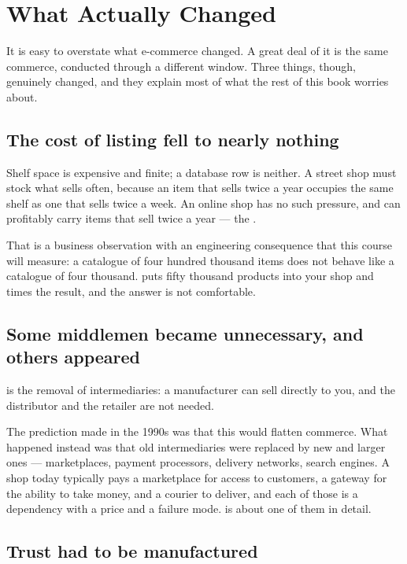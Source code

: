 \section{What Actually Changed}

It is easy to overstate what e-commerce changed. A great deal of it is the same
commerce, conducted through a different window. Three things, though, genuinely
changed, and they explain most of what the rest of this book worries about.

\subsection{The cost of listing fell to nearly nothing}

Shelf space is expensive and finite; a database row is neither. A street shop
must stock what sells often, because an item that sells twice a year occupies
the same shelf as one that sells twice a week. An online shop has no such
pressure, and can profitably carry items that sell twice a year --- the
.

That is a business observation with an engineering consequence that this course
will measure: a catalogue of four hundred thousand items does not behave like a
catalogue of four thousand.  puts fifty thousand products into
your shop and times the result, and the answer is not comfortable.

\subsection{Some middlemen became unnecessary, and others appeared}

 is the removal of intermediaries: a manufacturer can
sell directly to you, and the distributor and the retailer are not needed.

The prediction made in the 1990s was that this would flatten commerce. What
happened instead was that old intermediaries were replaced by new and larger
ones --- marketplaces, payment processors, delivery networks, search engines.
A shop today typically pays a marketplace for access to customers, a gateway
for the ability to take money, and a courier to deliver, and each of those is a
dependency with a price and a failure mode.  is about one of
them in detail.

\subsection{Trust had to be manufactured}

